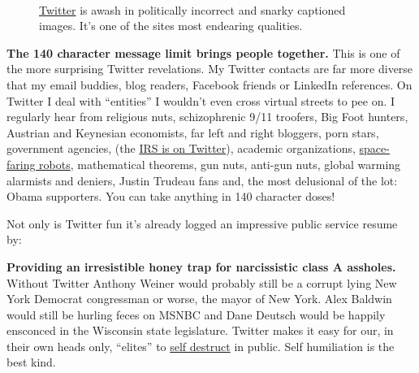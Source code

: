 \captionsetup[figure]{labelformat=empty}
\begin{figure}[htbp]
  \centering   
   \\
  \caption[\href{https://twitter.com/}{Twitter} is awash in politically incorrect and snarky images]{\href{https://twitter.com/}{Twitter} is awash in politically incorrect and snarky captioned images. 
It's one of the sites most endearing qualities.}
  \label{jpg:twittertriv4375}
\end{figure}

\textbf{The 140 character message limit brings people together.} This is
one of the more surprising Twitter revelations. My Twitter contacts are
far more diverse that my email buddies, blog readers, Facebook friends
or LinkedIn references. On Twitter I deal with ``entities'' I wouldn't
even cross virtual streets to pee on. I regularly hear from religious
nuts, schizophrenic 9/11 troofers, Big Foot hunters, Austrian and
Keynesian economists, far left and right bloggers, porn stars,
government agencies, (the \href{https://twitter.com/IRSnews}{IRS is on
Twitter}), academic organizations,
\href{https://twitter.com/MarsCuriosity}{space-faring robots},
mathematical theorems, gun nuts, anti-gun nuts, global warming alarmists
and deniers, Justin Trudeau fans and, the most delusional of the lot:
Obama supporters. You can take anything in 140 character doses!

Not only is Twitter fun it's already logged an impressive public service
resume by:

\textbf{Providing an irresistible honey trap for narcissistic class A
assholes.} Without Twitter Anthony Weiner would probably still be a
corrupt lying New York Democrat congressman or worse, the mayor of New
York. Alex Baldwin would still be hurling feces on MSNBC and Dane
Deutsch would be happily ensconced in the Wisconsin state legislature.
Twitter makes it easy for our, in their own heads only, ``elites'' to
\href{http://content.time.com/time/specials/packages/article/0,28804,2075071\_2075082\_2075118,00.html}{self
destruct} in public. Self humiliation is the best kind.

